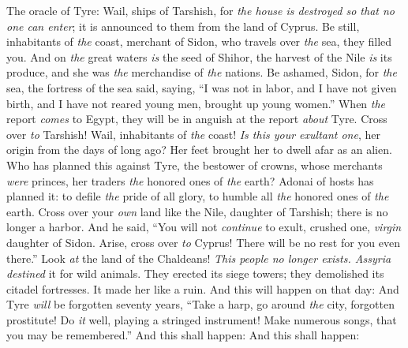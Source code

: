 \begin{biblechapter} %
 The oracle of Tyre:
\verse Wail, ships of Tarshish, for \textit{the house is destroyed so that no one can enter}; 
it is announced to them from the land of Cyprus.
\verse Be still, inhabitants of \textit{the} coast, 
merchant of Sidon, who travels over \textit{the} sea, they filled you.
\verse And on \textit{the} great waters \textit{is} the seed of Shihor, 
the harvest of the Nile \textit{is} its produce, 
and she was \textit{the} merchandise of \textit{the} nations.
\verse Be ashamed, Sidon, for \textit{the} sea, 
the fortress of the sea said, saying, 
“I was not in labor, 
and I have not given birth, 
and I have not reared young men, 
brought up young women.”
\verse When \textit{the} report \textit{comes} to Egypt, 
they will be in anguish at the report \textit{about} Tyre.
\verse Cross over \textit{to} Tarshish! 
Wail, inhabitants of \textit{the} coast!
\verse \textit{Is this your exultant one}, her origin from the days of long ago? 
Her feet brought her to dwell afar as an alien.
\verse Who has planned this against Tyre, the bestower of crowns, 
whose merchants \textit{were} princes, 
her traders \textit{the} honored ones of \textit{the} earth?
\verse Adonai of hosts has planned it: 
to defile \textit{the} pride of all glory, 
to humble all \textit{the} honored ones of \textit{the} earth.
\verse Cross over your \textit{own} land like the Nile, daughter of Tarshish; 
there is no longer a harbor.
\verse And he said,
\verse “You will not \textit{continue} to exult, crushed one, \textit{virgin} daughter of Sidon. 
Arise, cross over \textit{to} Cyprus! There will be no rest for you even there.”
\verse Look \textit{at} the land of the Chaldeans! 
\textit{This people no longer exists. 
Assyria destined} it for wild animals. 
They erected its siege towers; 
they demolished its citadel fortresses. 
It made her like a ruin.
\verse And this will happen on that day: And Tyre \textit{will} be forgotten seventy years,
\verse “Take a harp, 
go around \textit{the} city, forgotten prostitute! 
Do \textit{it} well, playing a stringed instrument! 
Make numerous songs, that you may be remembered.”
\verse And this shall happen:
\verse And this shall happen:
\end{biblechapter}

